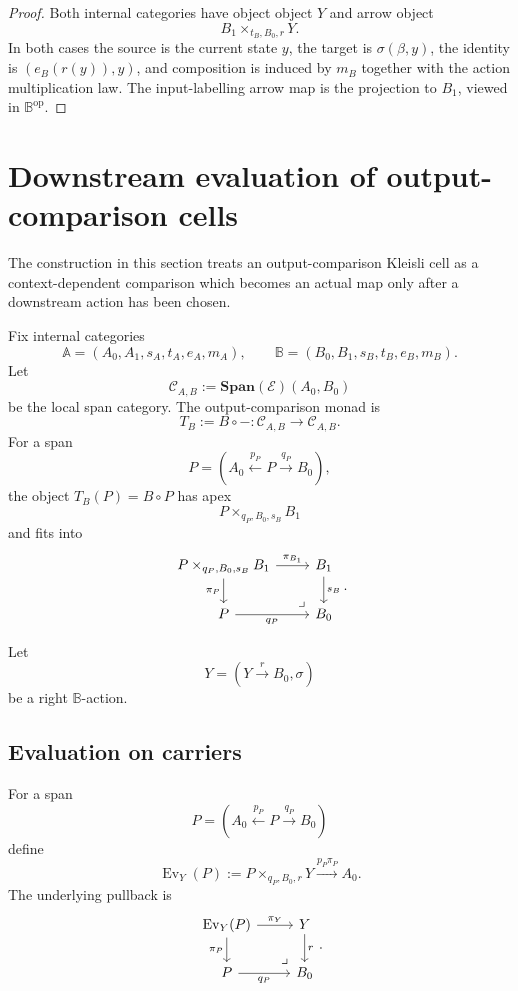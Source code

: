\begin{proof}
Both internal categories have object object \(Y\) and arrow object
\[
    B_1\times_{t_B,B_0,r}Y.
\]
In both cases the source is the current state \(y\), the target is
\(\sigma(\beta,y)\), the identity is \((e_B(r(y)),y)\), and composition is
induced by \(m_B\) together with the action multiplication law.  The
input-labelling arrow map is the projection to \(B_1\), viewed in
\(\mathbb B^{\mathrm{op}}\).
\end{proof}

\section{Downstream evaluation of output-comparison cells}
\label{sec:relative-kleisli-evaluation}

The construction in this section treats an output-comparison Kleisli cell as a
context-dependent comparison which becomes an actual map only after a
downstream action has been chosen.

Fix internal categories
\[
\mathbb A=(A_0,A_1,s_A,t_A,e_A,m_A),
\qquad
\mathbb B=(B_0,B_1,s_B,t_B,e_B,m_B).
\]
Let
\[
\mathcal C_{A,B}:=\mathbf{Span}(\mathcal E)(A_0,B_0)
\]
be the local span category. The output-comparison monad is
\[
T_B:=B\circ -:\mathcal C_{A,B}\to\mathcal C_{A,B}.
\]
For a span
\[
P=\left(A_0\xleftarrow{p_P}P\xrightarrow{q_P}B_0\right),
\]
the object \(T_B(P)=B\circ P\) has apex
\[
P\times_{q_P,B_0,s_B}B_1
\]
and fits into
\[
\begin{tikzcd}
P\times_{q_P,B_0,s_B}B_1
\arrow[r,"\pi_{B_1}"]
\arrow[d,"\pi_P"']
&
B_1
\arrow[d,"s_B"]
\\
P
\arrow[r,"q_P"']
&
B_0
\arrow[ul,phantom,very near start,"\lrcorner"]
\end{tikzcd}
.
\]

Let
\[
Y=(Y\xrightarrow{r}B_0,\sigma)
\]
be a right \(\mathbb B\)-action.

\subsection{Evaluation on carriers}
\label{subsec:relative-evaluation-carriers}

\begin{definition}
\label{def:relative-downstream-evaluation-carriers}
For a span
\[
P=
\left(
A_0\xleftarrow{p_P}P\xrightarrow{q_P}B_0
\right)
\]
define
\[
\operatorname{Ev}_Y(P)
:=
P\times_{q_P,B_0,r}Y
\xrightarrow{p_P\pi_P}
A_0.
\]
The underlying pullback is
\[
\begin{tikzcd}
\operatorname{Ev}_Y(P)
\arrow[r,"\pi_Y"]
\arrow[d,"\pi_P"']
&
Y
\arrow[d,"r"]
\\
P
\arrow[r,"q_P"']
&
B_0
\arrow[ul,phantom,very near start,"\lrcorner"]
\end{tikzcd}
.
\]
\end{definition}

